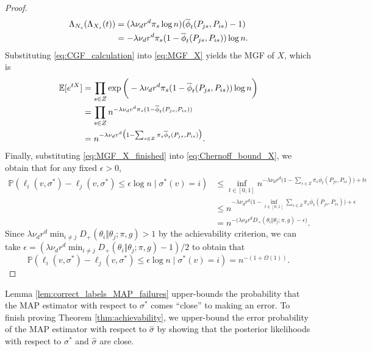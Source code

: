\documentclass{article}
\renewcommand{\P}{\mathbb{P}}
\newcommand{\E}{\mathbb{E}}
\newcommand{\1}{\mathbbm{1}}
\theoremstyle{definition}
\theoremstyle{plain}
\begin{document}
\begin{proof}
    \begin{align}
    \label{eq:CGF_calculation}
        \Lambda_{N_s}(\Lambda_{X_s}(t)) &= (\lambda \nu_d r^d \pi_s \log n) (\overline{\phi}_t(P_{js}, P_{is}) - 1) \notag \\
        &= - \lambda \nu_d r^d \pi_s (1 - \overline{\phi}_t(P_{js}, P_{is})) \log n.
    \end{align}
    Substituting \eqref{eq:CGF_calculation} into \eqref{eq:MGF_X} yields the MGF of $X$, which is
    \begin{align}
    \label{eq:MGF_X_finished}
        \E[e^{tX}] &= \prod_{s \in Z} \exp\bigg( - \lambda \nu_d r^d \pi_s (1 - \overline{\phi}_t(P_{js}, P_{is})) \log n \bigg) \notag \\
        &= \prod_{s \in Z} n^{- \lambda \nu_d r^d \pi_s (1 - \overline{\phi}_t(P_{js}, P_{is}))} \notag \\
        &= n^{-\lambda \nu_d r^d \big( 1 - \sum_{s \in Z} \pi_s \overline{\phi}_t(P_{js}, P_{is}) \big)}.
    \end{align}
    Finally, substituting \eqref{eq:MGF_X_finished} into \eqref{eq:Chernoff_bound_X}, we obtain that for any fixed $\epsilon > 0$,
    \begin{align*}
        \P(\ell_i(v, \sigma^*) - \ell_j(v, \sigma^*) \leq \epsilon \log n \mid \sigma^*(v) = i) &\leq \inf_{t \in [0, 1]} n^{-\lambda \nu_d r^d \big( 1 - \sum_{s \in Z} \pi_s \overline{\phi}_t(P_{js}, P_{is}) \big) + t\epsilon} \\
        &\leq n^{-\lambda \nu_d r^d \big( 1 - \inf_{t \in [0, 1]} \sum_{s \in Z} \pi_s \overline{\phi}_t(P_{js}, P_{is}) \big) + \epsilon} \\
        &= n^{-\big(\lambda \nu_d r^d D_+(\theta_i \Vert \theta_j; \pi, g) - \epsilon \big)}.
    \end{align*}
    Since $\lambda \nu_d r^d \min_{i \neq j} D_+(\theta_i \Vert \theta_j; \pi, g) > 1$ by the achievability criterion, we can take $\epsilon = (\lambda \nu_d r^d \min_{i \neq j} D_+(\theta_i \Vert \theta_j; \pi, g) - 1)/2$ to obtain that
    \begin{equation*}
        \P(\ell_i(v, \sigma^*) - \ell_j(v, \sigma^*) \leq \epsilon \log n \mid \sigma^*(v) = i) = n^{-(1 + \Omega(1))}.
    \end{equation*}
\end{proof}

Lemma \ref{lem:correct_labels_MAP_failures} upper-bounds the probability that the MAP estimator with respect to $\sigma^*$ comes ``close'' to making an error. To finish proving Theorem \ref{thm:achievability}, we upper-bound the error probability of the MAP estimator with respect to $\hat{\sigma}$ by showing that the posterior likelihoods with respect to $\sigma^*$ and $\hat{\sigma}$ are close.
\end{document}
